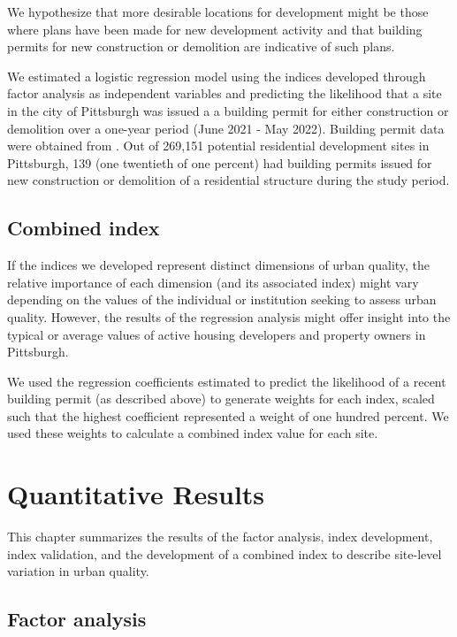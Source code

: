 \documentclass[
]{book}
\begin{document}
We hypothesize that more desirable locations for development might be those where
plans have been made for new development activity and that building permits for
new construction or demolition are indicative of such plans.

We estimated a logistic regression model using the indices developed through
factor analysis as independent variables and predicting the likelihood that
a site in the city of Pittsburgh was issued a a building permit for either
construction or demolition over a one-year period (June 2021 - May 2022). Building
permit data were obtained from \citet{western_pennsylvania_regional_data_center_permits_2022}.
Out of 269,151 potential residential development sites in Pittsburgh, 139 (one
twentieth of one percent) had building permits issued for new construction or
demolition of a residential structure during the study period.

\hypertarget{combined-index}{%
\section{Combined index}\label{combined-index}}

If the indices we developed represent distinct dimensions of urban quality,
the relative importance of each dimension (and its associated index) might vary
depending on the values of the individual or institution seeking to assess urban
quality. However, the results of the regression analysis might offer insight into
the typical or average values of active housing developers and property owners in
Pittsburgh.

We used the regression coefficients estimated to predict the likelihood
of a recent building permit (as described above) to generate weights for
each index, scaled such that the highest coefficient represented a weight
of one hundred percent. We used these weights to calculate a combined index
value for each site.

\hypertarget{quantitative-results}{%
\chapter{Quantitative Results}\label{quantitative-results}}

This chapter summarizes the results of the factor analysis, index development,
index validation, and the development of a combined index to describe site-level
variation in urban quality.

\hypertarget{factor-analysis}{%
\section{Factor analysis}\label{factor-analysis}}
\end{document}
